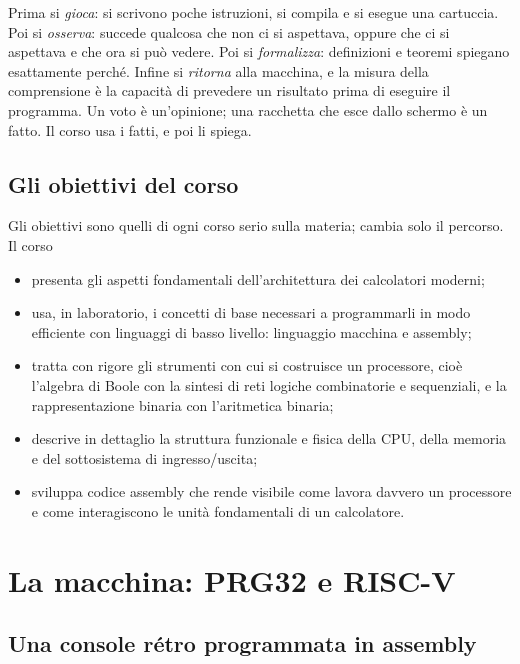 Prima si \emph{gioca}: si scrivono poche istruzioni, si compila e si esegue una
cartuccia. Poi si \emph{osserva}: succede qualcosa che non ci si aspettava,
oppure che ci si aspettava e che ora si può vedere. Poi si \emph{formalizza}:
definizioni e teoremi spiegano esattamente perché. Infine si \emph{ritorna}
alla macchina, e la misura della comprensione è la capacità di prevedere un
risultato prima di eseguire il programma. Un voto è un'opinione; una racchetta
che esce dallo schermo è un fatto. Il corso usa i fatti, e poi li spiega.

\subsection{Gli obiettivi del corso}

Gli obiettivi sono quelli di ogni corso serio sulla materia; cambia solo il
percorso. Il corso

\begin{itemize}
\item presenta gli aspetti fondamentali dell'architettura dei calcolatori
  moderni;
\item usa, in laboratorio, i concetti di base necessari a programmarli in modo
  efficiente con linguaggi di basso livello: linguaggio macchina e assembly;
\item tratta con rigore gli strumenti con cui si costruisce un processore,
  cioè l'algebra di Boole con la sintesi di reti logiche combinatorie e
  sequenziali, e la rappresentazione binaria con l'aritmetica binaria;
\item descrive in dettaglio la struttura funzionale e fisica della CPU, della
  memoria e del sottosistema di ingresso/uscita;
\item sviluppa codice assembly che rende visibile come lavora davvero un
  processore e come interagiscono le unità fondamentali di un calcolatore.
\end{itemize}

\section{La macchina: PRG32 e RISC-V}

\subsection{Una console rétro programmata in assembly}

